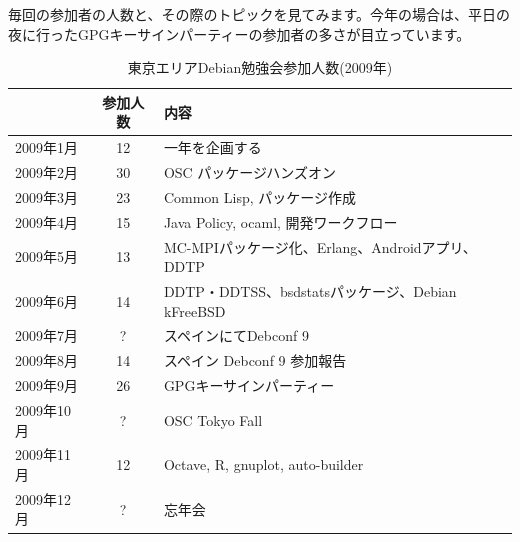 \documentclass[mingoth,a4paper]{jsarticle}
\begin{document}
毎回の参加者の人数と、その際のトピックを見てみます。今年の場合は、平日の
夜に行ったGPGキーサインパーティーの参加者の多さが目立っています。

\begin{table}[h]
 \caption{東京エリアDebian勉強会参加人数(2009年)}\label{tab:count2009}
 \begin{center}
  \begin{tabular}{|l|c|p{20em}|}
 \hline
 & 参加人数 & 内容\\
 \hline
   2009年1月 & 12 & 一年を企画する \\
   2009年2月 & 30 & OSC パッケージハンズオン\\ 
   2009年3月 & 23 & Common Lisp, パッケージ作成 \\
   2009年4月 & 15 & Java Policy, ocaml, 開発ワークフロー\\
   2009年5月 & 13 & MC-MPIパッケージ化、Erlang、Androidアプリ、DDTP \\   
   2009年6月 & 14 & DDTP・DDTSS、bsdstatsパッケージ、Debian kFreeBSD\\
   2009年7月 & ? & スペインにてDebconf 9\\
   2009年8月 & 14 & スペイン Debconf 9 参加報告 \\   
   2009年9月 & 26 & GPGキーサインパーティー \\   
   2009年10月 & ? & OSC Tokyo Fall\\
   2009年11月 & 12 & Octave, R, gnuplot, auto-builder \\
   2009年12月 & ? & 忘年会\\
 \hline
  \end{tabular}
 \end{center}
\end{table}
 
\end{document}
